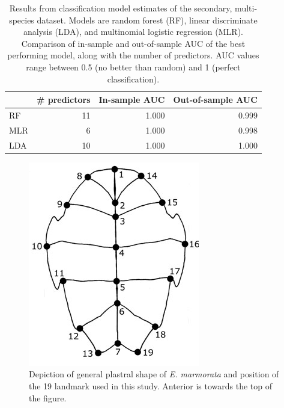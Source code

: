 \documentclass[12pt,letterpaper]{article}
\begin{document}
\begin{table}[ht]
  \centering
  \caption{Results from classification model estimates of the secondary, multi-species dataset. Models are random forest (RF), linear discriminate analysis (LDA), and multinomial logistic regression (MLR). Comparison of in-sample and out-of-sample AUC of the best performing model, along with the number of predictors. AUC values range between 0.5 (no better than random) and 1 (perfect classification).}
  \begin{tabular}{ l r r r }
    \hline
    & \# predictors & In-sample AUC & Out-of-sample AUC \\ 
    \hline
    \hline
    RF &   11 & 1.000 & 0.999 \\ 
    MLR &    6 & 1.000 & 0.998 \\ 
    LDA &   10 & 1.000 & 1.000 \\ 
    \hline
  \end{tabular}
  \label{tab:second_res}
\end{table}

\clearpage

\begin{figure}[ht]
  \centering
  \includegraphics[height = \textheight, width = \textwidth, keepaspectratio = true]{figure/plastra}
  \caption{Depiction of general plastral shape of \textit{E. marmorata} and position of the 19 landmark used in this study. Anterior is towards the top of the figure.}
  \label{fig:plastra}
\end{figure}
\end{document}
